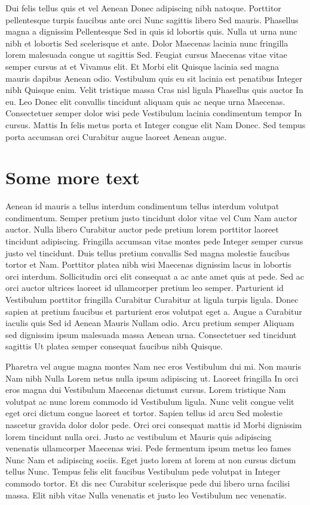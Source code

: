 Dui felis tellus quis et vel Aenean Donec adipiscing nibh natoque. Porttitor pellentesque turpis faucibus ante orci Nunc sagittis libero Sed mauris. Phasellus magna a dignissim Pellentesque Sed in quis id lobortis quis. Nulla ut urna nunc nibh et lobortis Sed scelerisque et ante. Dolor Maecenas lacinia nunc fringilla lorem malesuada congue ut sagittis Sed. Feugiat cursus Maecenas vitae vitae semper cursus at et Vivamus elit. Et Morbi elit Quisque lacinia sed magna mauris dapibus Aenean odio. Vestibulum quis eu sit lacinia est penatibus Integer nibh Quisque enim. Velit tristique massa Cras nisl ligula Phasellus quis auctor In eu. Leo Donec elit convallis tincidunt aliquam quis ac neque urna Maecenas. Consectetuer semper dolor wisi pede Vestibulum lacinia condimentum tempor In cursus. Mattis In felis metus porta et Integer congue elit Nam Donec. Sed tempus porta accumsan orci Curabitur augue laoreet Aenean augue.

\section{Some more text}
Aenean id mauris a tellus interdum condimentum tellus interdum volutpat condimentum. Semper pretium justo tincidunt dolor vitae vel Cum Nam auctor auctor. Nulla libero Curabitur auctor pede pretium lorem porttitor laoreet tincidunt adipiscing. Fringilla accumsan vitae montes pede Integer semper cursus justo vel tincidunt. Duis tellus pretium convallis Sed magna molestie faucibus tortor et Nam. Porttitor platea nibh wisi Maecenas dignissim lacus in lobortis orci interdum. Sollicitudin orci elit consequat a ac ante amet quis at pede. Sed ac orci auctor ultrices laoreet id ullamcorper pretium leo semper. Parturient id Vestibulum porttitor fringilla Curabitur Curabitur at ligula turpis ligula. Donec sapien at pretium faucibus et parturient eros volutpat eget a. Augue a Curabitur iaculis quis Sed id Aenean Mauris Nullam odio. Arcu pretium semper Aliquam sed dignissim ipsum malesuada massa Aenean urna. Consectetuer sed tincidunt sagittis Ut platea semper consequat faucibus nibh Quisque. 

Pharetra vel augue magna montes Nam nec eros Vestibulum dui mi. Non mauris Nam nibh Nulla Lorem netus nulla ipsum adipiscing ut. Laoreet fringilla In orci eros magna dui Vestibulum Maecenas dictumst cursus. Lorem tristique Nam volutpat ac nunc lorem commodo id Vestibulum ligula. Nunc velit congue velit eget orci dictum congue laoreet et tortor. Sapien tellus id arcu Sed molestie nascetur gravida dolor dolor pede. Orci orci consequat mattis id Morbi dignissim lorem tincidunt nulla orci. Justo ac vestibulum et Mauris quis adipiscing venenatis ullamcorper Maecenas wisi. Pede fermentum ipsum metus leo fames Nunc Nam et adipiscing sociis. Eget justo lorem at lorem at non cursus dictum tellus Nunc. Tempus felis elit faucibus Vestibulum pede volutpat in Integer commodo tortor. Et dis nec Curabitur scelerisque pede dui libero urna facilisi massa. Elit nibh vitae Nulla venenatis et justo leo Vestibulum nec venenatis. 


